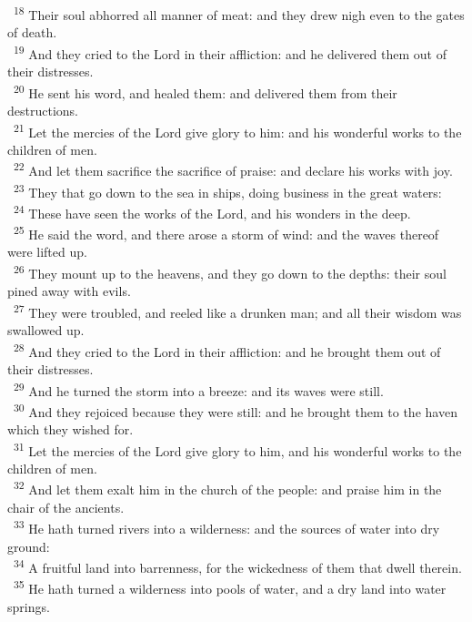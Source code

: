 \documentclass[a5paper,12pt]{article}
\begin{document}
\begin{multicols*}{2}
~\textsuperscript{18} Their soul abhorred all manner of meat: and they drew nigh even to the gates of death.\\
~\textsuperscript{19} And they cried to the Lord in their affliction: and he delivered them out of their distresses.\\
~\textsuperscript{20} He sent his word, and healed them: and delivered them from their destructions.\\
~\textsuperscript{21} Let the mercies of the Lord give glory to him: and his wonderful works to the children of men.\\
~\textsuperscript{22} And let them sacrifice the sacrifice of praise: and declare his works with joy.\\
~\textsuperscript{23} They that go down to the sea in ships, doing business in the great waters:\\
~\textsuperscript{24} These have seen the works of the Lord, and his wonders in the deep.\\
~\textsuperscript{25} He said the word, and there arose a storm of wind: and the waves thereof were lifted up.\\
~\textsuperscript{26} They mount up to the heavens, and they go down to the depths: their soul pined away with evils.\\
~\textsuperscript{27} They were troubled, and reeled like a drunken man; and all their wisdom was swallowed up.\\
~\textsuperscript{28} And they cried to the Lord in their affliction: and he brought them out of their distresses.\\
~\textsuperscript{29} And he turned the storm into a breeze: and its waves were still.\\
~\textsuperscript{30} And they rejoiced because they were still: and he brought them to the haven which they wished for.\\
~\textsuperscript{31} Let the mercies of the Lord give glory to him, and his wonderful works to the children of men.\\
~\textsuperscript{32} And let them exalt him in the church of the people: and praise him in the chair of the ancients.\\
~\textsuperscript{33} He hath turned rivers into a wilderness: and the sources of water into dry ground:\\
~\textsuperscript{34} A fruitful land into barrenness, for the wickedness of them that dwell therein.\\
~\textsuperscript{35} He hath turned a wilderness into pools of water, and a dry land into water springs.\\

\end{multicols*}
\end{document}
